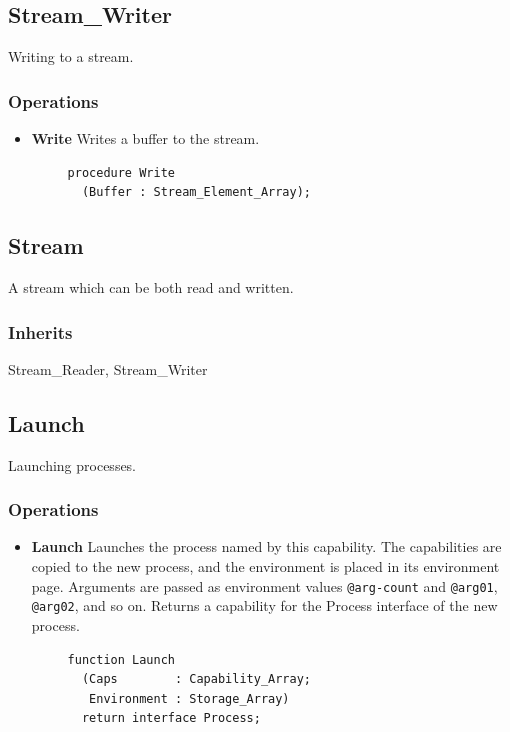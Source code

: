 \subsection{Stream\_Writer}

Writing to a stream.

\subsubsection{Operations}

\begin{itemize}
    \item \textbf{Write} Writes a buffer to the stream.

    \begin{verbatim}
     procedure Write
       (Buffer : Stream_Element_Array);
    \end{verbatim}
\end{itemize}

\subsection{Stream}

A stream which can be both read and written.

\subsubsection{Inherits}

Stream\_Reader, Stream\_Writer

\subsection{Launch}

Launching processes.

\subsubsection{Operations}

\begin{itemize}
    \item \textbf{Launch} Launches the process named by this capability.  The capabilities are copied to the new process, and the environment is placed in its environment page.  Arguments are passed as environment values {\tt @arg-count} and {\tt @arg01}, {\tt @arg02}, and so on.  Returns a capability for the Process interface of the new process.

    \begin{verbatim}
     function Launch
       (Caps        : Capability_Array;
        Environment : Storage_Array)
       return interface Process;
    \end{verbatim}
\end{itemize}

